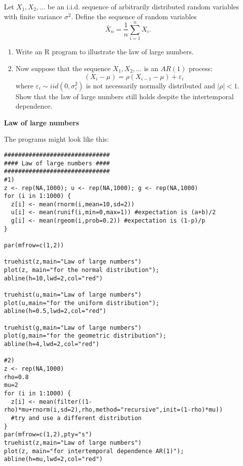 \documentclass{article}
\begin{document}
Let $X_{1},X_{2},\ldots $ be an i.i.d. sequence of arbitrarily distributed
random variables with finite variance $\sigma ^{2}$. Define the sequence of
random variables%
\begin{equation*}
\bar{X}_{n}=\frac{1}{n}\sum_{i=1}^{n}X_{i}.
\end{equation*}

\begin{enumerate}\setlength{\itemsep}{-2pt}
\item Write an R program to illustrate the law of large numbers.

\item Now suppose that the sequence $X_{1},X_{2},\ldots $ is an $AR(1)$
process:
$$\left( X_{i}-\mu \right) =\rho \left( X_{i-1}-\mu \right) +\varepsilon _{i}$$
where $\varepsilon _{i}\sim iid(0,\sigma _{\varepsilon }^{2})$ is not
necessarily normally distributed and $|\rho |<1$. Show that the law of large
numbers still holds despite the intertemporal dependence.
\end{enumerate}

\begin{solution}
\textbf{Law of large numbers}

The programs might look like this:
\begin{verbatim}
##############################
#### Law of large numbers ####
##############################
#1)
z <- rep(NA,1000); u <- rep(NA,1000); g <- rep(NA,1000)
for (i in 1:1000) {
  z[i] <- mean(rnorm(i,mean=10,sd=2))
  u[i] <- mean(runif(i,min=0,max=1)) #expectation is (a+b)/2
  g[i] <- mean(rgeom(i,prob=0.2)) #expectation is (1-p)/p
}

par(mfrow=c(1,2))

truehist(z,main="Law of large numbers")
plot(z, main="for the normal distribution"); abline(h=10,lwd=2,col="red")

truehist(u,main="Law of large numbers")
plot(u,main="for the uniform distribution"); abline(h=0.5,lwd=2,col="red")

truehist(g,main="Law of large numbers")
plot(g,main="for the geometric distribution"); abline(h=4,lwd=2,col="red")

#2)
z <- rep(NA,1000)
rho=0.8
mu=2
for (i in 1:1000) {
  z[i] <- mean(filter((1-rho)*mu+rnorm(i,sd=2),rho,method="recursive",init=(1-rho)*mu))
  #try and use a different distribution
}
par(mfrow=c(1,2),pty="s")
truehist(z,main="Law of large numbers")
plot(z, main="for intertemporal dependence AR(1)"); abline(h=mu,lwd=2,col="red")
\end{verbatim}
\end{solution}
\end{document}
